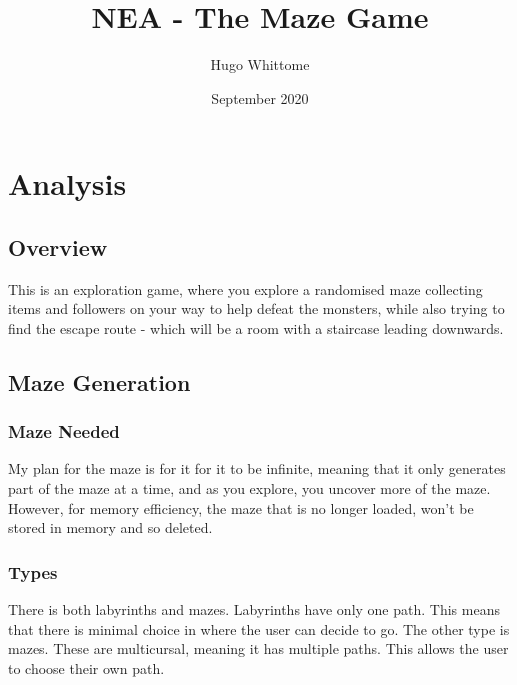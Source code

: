 \documentclass{article}
\title{NEA - The Maze Game}
\author{Hugo Whittome}
\date{September 2020}
\begin{document}
    \maketitle %
    \tableofcontents
    \clearpage
    \section{Analysis}
        \subsection{Overview}
            This is an exploration game, where you explore a randomised maze collecting items and followers on your way to help defeat the monsters, while also trying to find the escape route - which will be a room with a staircase leading downwards.
        \subsection{Maze Generation}
            \subsubsection{Maze Needed}
                My plan for the maze is for it for it to be infinite, meaning that it only generates part of the maze at a time, and as you explore, you uncover more of the maze. However, for memory efficiency, the maze that is no longer loaded, won't be stored in memory and so deleted.
            \subsubsection{Types}
                There is both labyrinths and mazes. Labyrinths have only one path. This means that there is minimal choice in where the user can decide to go.
                The other type is mazes. These are multicursal, meaning it has multiple paths. This allows the user to choose their own path.
\end{document}
